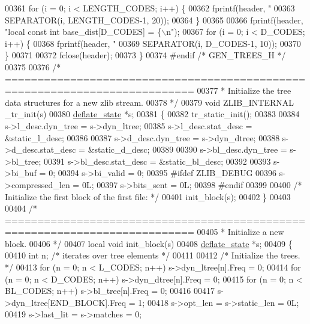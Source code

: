 \begin{DoxyCode}
{{{{{{{00361     \textcolor{keywordflow}{for} (i = 0; i < LENGTH\_CODES; i++) \{
00362         fprintf(header, \textcolor{stringliteral}{"%
00363                 SEPARATOR(i, LENGTH\_CODES-1, 20));
00364     \}
00365 
00366     fprintf(header, \textcolor{stringliteral}{"local const int base\_dist[D\_CODES] = \{\(\backslash\)n"});
00367     \textcolor{keywordflow}{for} (i = 0; i < D\_CODES; i++) \{
00368         fprintf(header, \textcolor{stringliteral}{"%
00369                 SEPARATOR(i, D\_CODES-1, 10));
00370     \}
00371 
00372     fclose(header);
00373 \}
00374 \textcolor{preprocessor}{#endif }\textcolor{comment}{/* GEN\_TREES\_H */}\textcolor{preprocessor}{}
00375 
00376 \textcolor{comment}{/* ===========================================================================}
00377 \textcolor{comment}{ * Initialize the tree data structures for a new zlib stream.}
00378 \textcolor{comment}{ */}
00379 \textcolor{keywordtype}{void} ZLIB\_INTERNAL \_tr\_init(s)
00380     \hyperlink{structinternal__state}{deflate\_state} *s;
00381 \{
00382     tr\_static\_init();
00383 
00384     s->l\_desc.dyn\_tree = s->dyn\_ltree;
00385     s->l\_desc.stat\_desc = &static\_l\_desc;
00386 
00387     s->d\_desc.dyn\_tree = s->dyn\_dtree;
00388     s->d\_desc.stat\_desc = &static\_d\_desc;
00389 
00390     s->bl\_desc.dyn\_tree = s->bl\_tree;
00391     s->bl\_desc.stat\_desc = &static\_bl\_desc;
00392 
00393     s->bi\_buf = 0;
00394     s->bi\_valid = 0;
00395 \textcolor{preprocessor}{#ifdef ZLIB\_DEBUG}
00396     s->compressed\_len = 0L;
00397     s->bits\_sent = 0L;
00398 \textcolor{preprocessor}{#endif}
00399 
00400     \textcolor{comment}{/* Initialize the first block of the first file: */}
00401     init\_block(s);
00402 \}
00403 
00404 \textcolor{comment}{/* ===========================================================================}
00405 \textcolor{comment}{ * Initialize a new block.}
00406 \textcolor{comment}{ */}
00407 local \textcolor{keywordtype}{void} init\_block(s)
00408     \hyperlink{structinternal__state}{deflate\_state} *s;
00409 \{
00410     \textcolor{keywordtype}{int} n; \textcolor{comment}{/* iterates over tree elements */}
00411 
00412     \textcolor{comment}{/* Initialize the trees. */}
00413     \textcolor{keywordflow}{for} (n = 0; n < L\_CODES;  n++) s->dyn\_ltree[n].Freq = 0;
00414     for (n = 0; n < D\_CODES;  n++) s->dyn\_dtree[n].Freq = 0;
00415     for (n = 0; n < BL\_CODES; n++) s->bl\_tree[n].Freq = 0;
00416 
00417     s->dyn\_ltree[END\_BLOCK].Freq = 1;
00418     s->opt\_len = s->static\_len = 0L;
00419     s->last\_lit = s->matches = 0;
}}}}}}}}}
\end{DoxyCode}
